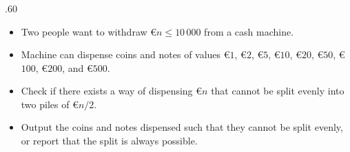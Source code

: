\begin{frame}
    \frametitle{\problemtitle}

    \begin{columns}
        \begin{column}[T]{.60\textwidth}
            \begin{itemize}
                \item Two people want to withdraw €$n\leq 10\,000$ from a cash machine.
                \item Machine can dispense coins and notes of values €$1$, €$2$, €$5$, €$10$, €$20$, €$50$, €$100$, €$200$, and €$500$.
                \item Check if there exists a way of dispensing €$n$ that cannot be split evenly into two piles of €$n/2$.
                \item Output the coins and notes dispensed such that they cannot be split evenly, or report that the split is always possible.
            \end{itemize}


        \end{column}

    \end{columns}
\end{frame}
